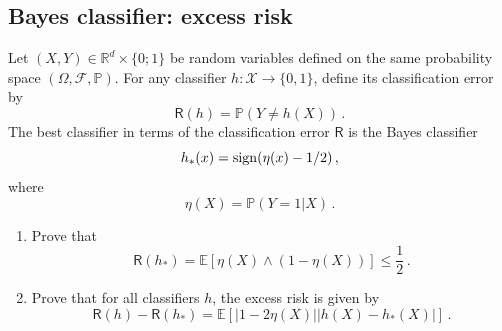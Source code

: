 \documentclass[a4paper,10pt,fleqn]{article}
\newcommand{\eqsp}{\,}
\newcommand{\calF}{\mathcal{F}}
\newcommand{\rset}{\ensuremath{\mathbb{R}}}
\newcommand{\bP}{\mathbb{P}}
\newcommand{\1}{\ensuremath{\mathbbm{1}}}
\begin{document}
\subsection{Bayes classifier: excess risk}
Let $(X,Y)\in\rset^d\times\{0;1\}$ be random variables defined on the same probability space $(\Omega,\calF,\bP)$.
For any classifier $h:\mathcal{X}\to \{0,1\}$, define its classification error by
$$
\mathsf{R}(h)=\bP(Y\neq h(X))\eqsp.
$$
The best classifier in terms of the classification error $\mathsf{R}$ is the Bayes classifier
$$
h_{*}(x)={\rm sign}(\eta(x)-1/2)\eqsp,
$$
where
$$
\eta(X) = \bP(Y=1|X)\eqsp.
$$
\begin{enumerate}
\item Prove that 
$$
\mathsf{R}(h_*) = \mathbb{E}\left[\eta(X) \wedge (1-\eta(X))\right]\leqslant \frac{1}{2}\eqsp.
$$
%
%
\item Prove that for all classifiers $h$, the excess risk is given by
$$
\mathsf{R}(h)  - \mathsf{R}(h_*) = \mathbb{E}\left[\left|1-2\eta(X)\right|\left|h(X) - h_*(X)\right|\right]\eqsp.
$$
%
%
\end{enumerate}
\end{document}
